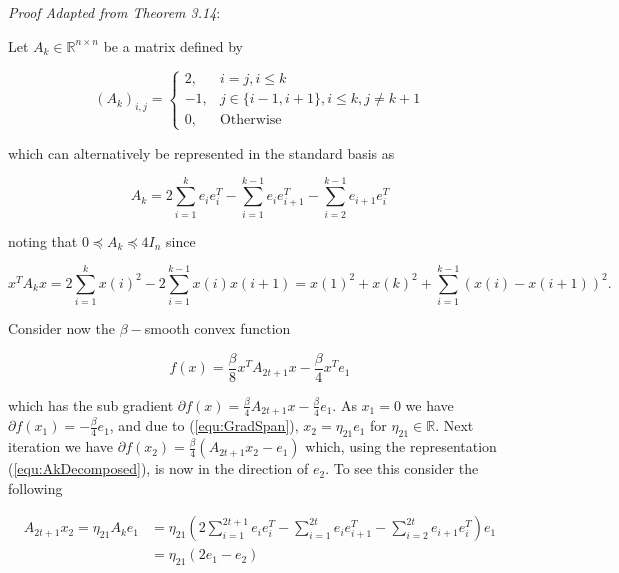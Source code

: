 \textit{Proof Adapted from \cite{bubeck} Theorem 3.14}:


Let $A_k \in \mathbb{R}^{n \times n}$ be a matrix defined by 

\begin{equation*}
(A_k)_{i,j} = \begin{cases}
2, & i = j,i \leq k \\
-1, & j \in \{i-1,i+1\}, i \leq k, j \not= k+1 \\
0, &\text{Otherwise}
\end{cases}
\end{equation*}

which can alternatively be represented in the standard basis as

\begin{equation}
A_k = 2 \sum_{i=1}^k e_i e_i^T - \sum_{i=1}^{k-1} e_{i}e_{i+1}^T - \sum_{i=2}^{k-1}e_{i+1} e_i^T
\label{equ:AkDecomposed}
\end{equation}

noting that $0 \preccurlyeq  A_k  \preccurlyeq 4 I_n$ since

\begin{equation*}
x^TA_kx = 2 \sum_{i=1}^k x(i)^2 -2\sum_{i=1}^{k-1}x(i)x(i+1) =
 x(1)^2 + x(k)^2 + \sum_{i=1}^{k-1} (x(i) - x(i+1))^2.
\end{equation*}

Consider now the $\beta-$smooth convex function 

\begin{equation*}
f(x) = \frac{\beta}{8}x^T A_{2t +1} x - \frac{\beta}{4}x^T e_1
\end{equation*}

which has the sub gradient $\partial f(x) = \frac{\beta}{4} A_{2t +1} x - \frac{\beta}{4}e_1$. As $x_1=0$ we have $\partial f(x_1) = - \frac{\beta}{4}e_1$, and due to (\ref{equ:GradSpan}), $x_2 = \eta_{21}e_1$ for $\eta_{21} \in \mathbb{R}$. Next iteration we have $\partial f(x_2) = \frac{\beta}{4} \left( A_{2t+1} x_2 - e_1\right)$ which, using the representation (\ref{equ:AkDecomposed}), is now in the direction of $e_2$. To see this consider the following 


\begin{align*}
A_{2t+1}x_2 = \eta_{21} A_k e_1 & = \eta_{21} \left( 
2 \sum_{i=1}^{2t+1} e_i e_i^T - \sum_{i=1}^{2t} e_{i}e_{i+1}^T - \sum_{i=2}^{2t}e_{i+1} e_i^T
\right)e_1\\
& = \eta_{21} \left( 
2 e_1 - e_{2} 
\right)
\end{align*}

